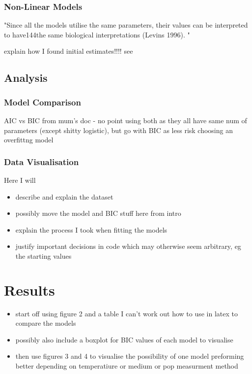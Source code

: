 \documentclass[11pt]{article}
\begin{document}
\subsubsection{Non-Linear Models}
"Since all the models utilise the same parameters, their values can be interpreted to have144the same biological interpretations (Levins 1996). "\parencite{Odenbaugh2006}

explain how I found initial estimates!!!! see \parencite{Micha2011}



\subsection{Analysis}
\subsubsection{Model Comparison}
AIC vs BIC from mum's doc - no point using both as they all have same num of parameters (except shitty logistic), but go with BIC as less risk choosing an overfittng model

\subsubsection{Data Visualisation}




Here I will
\begin{itemize}
    \item describe and explain the dataset
    \item possibly move the model and BIC stuff here from intro
    \item explain the process I took when fitting the models
    \item justify important decisions in code which may otherwise seem arbitrary, eg the starting values
\end{itemize}



\section{Results}%


\begin{itemize}
    \item start off using figure 2 and a table I can't work out how to use in latex to compare the models
    \item possibly also include a boxplot for BIC values of each model to visualise 
    \item then use figures 3 and 4 to visualise the possibility of one model preforming better depending on temperatiure or medium or pop measurment method
\end{itemize}
\end{document}
